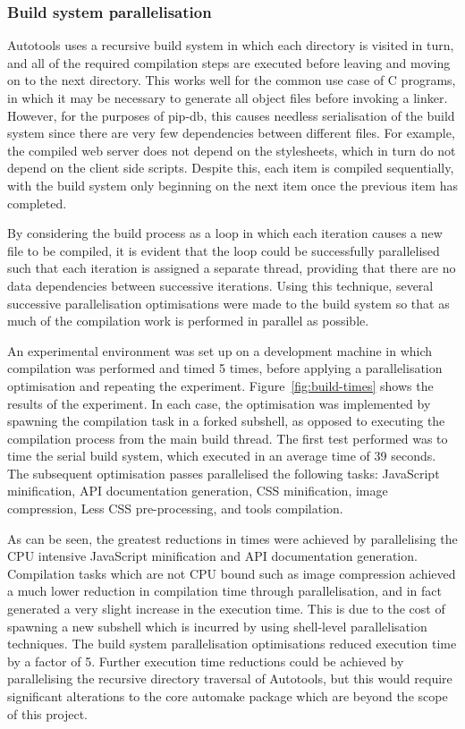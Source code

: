 \subsubsection*{Build system parallelisation}

Autotools uses a recursive build system in which each directory is
visited in turn, and all of the required compilation steps are
executed before leaving and moving on to the next directory. This
works well for the common use case of C programs, in which it may be
necessary to generate all object files before invoking a
linker. However, for the purposes of pip-db, this causes needless
serialisation of the build system since there are very few
dependencies between different files. For example, the compiled web
server does not depend on the stylesheets, which in turn do not depend
on the client side scripts. Despite this, each item is compiled
sequentially, with the build system only beginning on the next item
once the previous item has completed.

By considering the build process as a loop in which each iteration
causes a new file to be compiled, it is evident that the loop could be
successfully parallelised such that each iteration is assigned a
separate thread, providing that there are no data dependencies between
successive iterations. Using this technique, several successive
parallelisation optimisations were made to the build system so that as
much of the compilation work is performed in parallel as possible.

An experimental environment was set up on a development machine in
which compilation was performed and timed 5 times, before applying a
parallelisation optimisation and repeating the
experiment. Figure~\ref{fig:build-times} shows the results of the
experiment. In each case, the optimisation was implemented by spawning
the compilation task in a forked subshell, as opposed to executing the
compilation process from the main build thread. The first test
performed was to time the serial build system, which executed in an
average time of 39 seconds. The subsequent optimisation passes
parallelised the following tasks: JavaScript minification, API
documentation generation, CSS minification, image compression, Less
CSS pre-processing, and tools compilation.

As can be seen, the greatest reductions in times were achieved by
parallelising the CPU intensive JavaScript minification and API
documentation generation. Compilation tasks which are not CPU bound
such as image compression achieved a much lower reduction in
compilation time through parallelisation, and in fact generated a very
slight increase in the execution time. This is due to the cost of
spawning a new subshell which is incurred by using shell-level
parallelisation techniques. The build system parallelisation
optimisations reduced execution time by a factor of 5. Further
execution time reductions could be achieved by parallelising the
recursive directory traversal of Autotools, but this would require
significant alterations to the core automake package which are beyond
the scope of this project.


